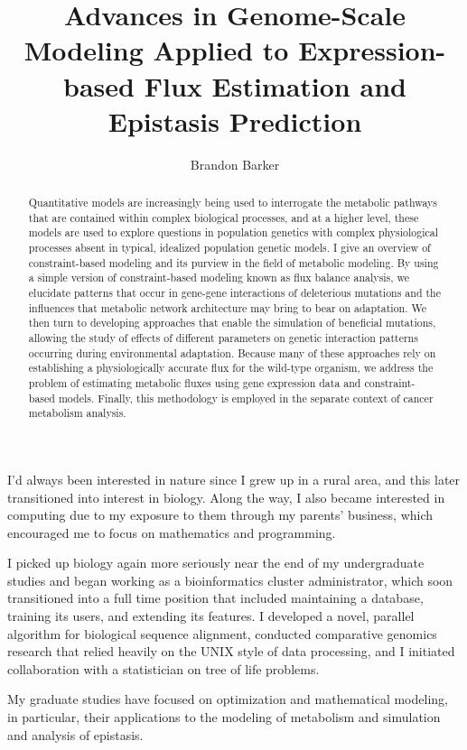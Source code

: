 \documentclass[phd,tocprelim]{cornell}
\title {Advances in Genome-Scale Modeling Applied to Expression-based
Flux Estimation and Epistasis Prediction}
\author {Brandon Barker}
\newcommand*{\commonDir}{./common/}    %
\begin{document}



\maketitle
\makecopyright

\begin{abstract}

Quantitative models are increasingly being used to interrogate the
metabolic pathways that are contained within complex biological
processes, and at a higher level, these models are used to explore
questions in population genetics with complex physiological processes
absent in typical, idealized population genetic models.  I give an
overview of constraint-based modeling and its purview in the field of
metabolic modeling. By using a simple version of constraint-based
modeling known as flux balance analysis, we elucidate patterns that
occur in gene-gene interactions of deleterious mutations and the
influences that metabolic network architecture may bring to bear on
adaptation. We then turn to developing approaches that enable the
simulation of beneficial mutations, allowing the study of effects of
different parameters on genetic interaction patterns occurring during
environmental adaptation. Because many of these approaches rely on
establishing a physiologically accurate flux for the wild-type
organism, we address the problem of estimating metabolic fluxes using
gene expression data and constraint-based models. Finally, this
methodology is employed in the separate context of cancer metabolism
analysis.
\end{abstract}

\begin{biosketch}
I'd always been interested in nature since I grew up in a rural area,
and this later transitioned into interest in biology. Along the way, I
also became interested in computing due to my exposure to them through
my parents' business, which encouraged me to focus on mathematics and
programming.

I picked up biology again more seriously near the end of my
undergraduate studies and began working as a bioinformatics cluster
administrator, which soon transitioned into a full time position that
included maintaining a database, training its users, and extending its
features. I developed a novel, parallel algorithm for biological
sequence alignment, conducted comparative genomics research that
relied heavily on the UNIX style of data processing, and I initiated
collaboration with a statistician on tree of life problems.

My graduate studies have focused on optimization and mathematical
modeling, in particular, their applications to the modeling of
metabolism and simulation and analysis of epistasis.
\end{biosketch}
\end{document}
